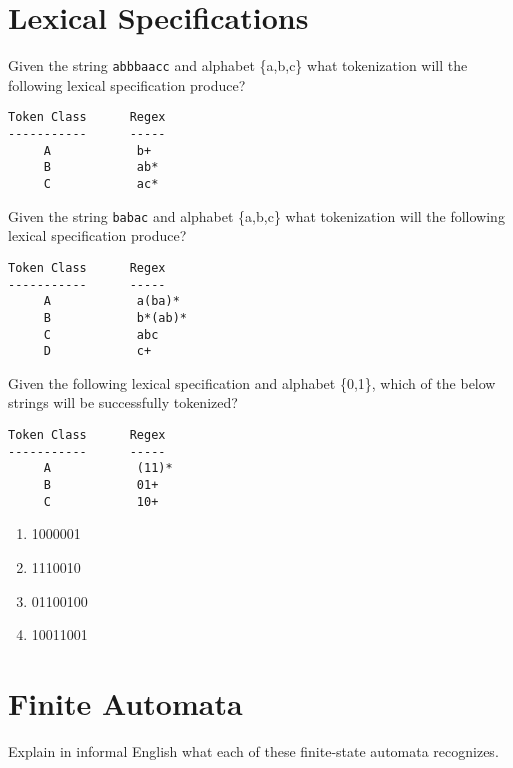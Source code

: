 \documentclass[11pt, oneside]{exam}
\newcommand{\cmark}{\ding{51}}
\begin{document}
\begin{questions}
\section*{Lexical Specifications}

\question[3]
Given the string {\tt abbbaacc} and alphabet \{a,b,c\} what tokenization will the following lexical specification produce?
\begin{verbatim}
Token Class      Regex
-----------      -----
     A            b+
     B            ab*
     C            ac*
\end{verbatim}
{\tt <B, abbb>}

\question[3]
Given the string {\tt babac} and alphabet \{a,b,c\} what tokenization will the following lexical specification produce?
\begin{verbatim}
Token Class      Regex
-----------      -----
     A            a(ba)*
     B            b*(ab)*
     C            abc
     D            c+
\end{verbatim}
{\tt <B, bab>}

\question[6]
Given the following lexical specification and alphabet \{0,1\}, which of the below strings will be successfully tokenized?
\begin{verbatim}
Token Class      Regex
-----------      -----
     A            (11)*
     B            01+
     C            10+
\end{verbatim}
\begin{enumerate}
\item 1000001 \cmark
\item 1110010 \cmark
\item 01100100 \cmark
\item 10011001 \cmark
\end{enumerate}

\section*{Finite Automata}

\question
Explain in informal English what each of these finite-state automata recognizes.

\end{questions}
\end{document}
